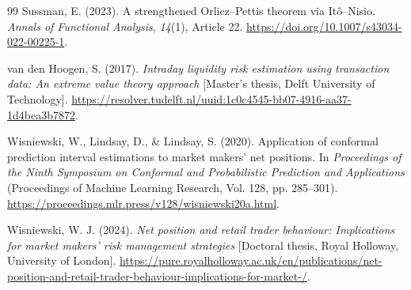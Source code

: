 \documentclass[11pt,a4paper]{article}
\begin{document}
\begin{thebibliography}{99}
 Sussman, E. (2023). A strengthened Orlicz--Pettis theorem via Itô--Nisio. \emph{Annals of Functional Analysis}, \emph{14}(1), Article 22. \url{https://doi.org/10.1007/s43034-022-00225-1}.

 van den Hoogen, S. (2017). \emph{Intraday liquidity risk estimation using transaction data: An extreme value theory approach} [Master's thesis, Delft University of Technology]. \url{https://resolver.tudelft.nl/uuid:1c0c4545-bb07-4916-aa37-1d4bea3b7872}.

 Wisniewski, W., Lindsay, D., \& Lindsay, S. (2020). Application of conformal prediction interval estimations to market makers' net positions. In \emph{Proceedings of the Ninth Symposium on Conformal and Probabilistic Prediction and Applications} (Proceedings of Machine Learning Research, Vol. 128, pp. 285--301). \url{https://proceedings.mlr.press/v128/wisniewski20a.html}.

 Wisniewski, W. J. (2024). \emph{Net position and retail trader behaviour: Implications for market makers' risk management strategies} [Doctoral thesis, Royal Holloway, University of London]. \url{https://pure.royalholloway.ac.uk/en/publications/net-position-and-retail-trader-behaviour-implications-for-market-/}.
\end{thebibliography}
\end{document}
